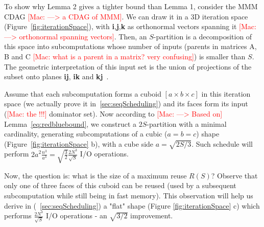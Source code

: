 \documentclass[sigplan,review,anonymous]{acmart}\settopmatter{printfolios=true,printccs=false,printacmref=false}
\newcommand\mac[1]{\textcolor{red}{[Mac: #1]}}
\begin{document}

To show why Lemma 2 gives a tighter bound than Lemma 1, consider the MMM CDAG
\mac{---> a CDAG of MMM}.  We can draw it in a 3D iteration space~\cite{tiling}
(Figure~\ref{fig:iterationSpace}), with \textbf{i},\textbf{j},\textbf{k} as
orthonormal vectors spanning it \mac{---> orthonormal spanning vectors}. Then,
an $S$-partition is a decomposition of this space into subcomputations whose
number of inputs (parents in matrices A, B and C \mac{what is a parent in a
	matrix? very confusing}) is smaller than $S$. The geometric interpretation 
	of
this input set is the union of projections of the subset onto planes
\textbf{ij}, \textbf{ik} and \textbf{kj}~\cite{loomisApplied}.

Assume that each subcomputation forms a cuboid $[a \times b \times c]$ in this
iteration space (we actually prove it in~\cref{sec:seqScheduling}) and its
faces form its input (\mac{the !!!} dominator set).  Now according to \mac{--->
	Based on} Lemma~\ref{eq:redbluebound}, we construct a $2S$-partition with a
minimal cardinality, generating subcomputations of a cubic ($a = b = c$) shape
(Figure~\ref{fig:iterationSpace} b), with a cube side $a = \sqrt{2S/3}$.  Such
schedule will perform $2a^2 \frac{n^3}{a^3} =
\sqrt{\frac{3}{2}}\frac{2N^3}{\sqrt{S}}$ I/O operations. 

Now, the question is: what is the size of a maximum reuse $R(S)$? Observe that
only one of three faces of this cuboid can be reused (used by a subsequent
subcomputation while still being in fast memory). This observation will help us
derive in (~\cref{sec:seqScheduling}) a "flat" shape (Figure 
\ref{fig:iterationSpace}
c) which performs $\frac{2N^3}{\sqrt{S}}$ I/O operations - an $\sqrt{3/2}$
improvement.
\end{document}
